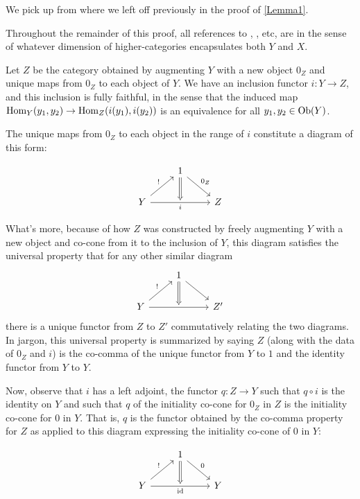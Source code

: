 \documentclass[./main.tex]{subfiles}
\begin{document}
\begin{proofEnd}
We pick up from where we left off previously in the proof of \cref{Lemma1}.

Throughout the remainder of this proof, all references to , , etc, are in the sense of whatever dimension of higher-categories encapsulates both $Y$ and $X$.

Let $Z$ be the category obtained by augmenting $Y$ with a new object $0_Z$ and unique maps from $0_Z$ to each object of $Y$. We have an inclusion functor $i : Y \to Z$, and this inclusion is fully faithful, in the sense that the induced map $\operatorname{Hom}_Y(y_1, y_2) \to \operatorname{Hom}_Z(i(y_1), i(y_2))$ is an equivalence for all $y_1, y_2 \in \operatorname{Ob}(Y)$.

The unique maps from $0_Z$ to each object in the range of $i$ constitute a diagram of this form:

\[\begin{tikzcd}
	& 1 \\
	Y && Z
	\arrow["\unique", from=2-1, to=1-2]
	\arrow["{0_Z}", from=1-2, to=2-3]
	\arrow[""{name=0, anchor=center}, "i"', from=2-1, to=2-3]
	\arrow[Rightarrow, from=1-2, to=0]
\end{tikzcd}\]

What's more, because of how $Z$ was constructed by freely augmenting $Y$ with a new object and co-cone from it to the inclusion of $Y$, this diagram satisfies the universal property that for any other similar diagram
\[\begin{tikzcd}
	& 1 \\
	Y && Z'
	\arrow["\unique", from=2-1, to=1-2]
	\arrow[from=1-2, to=2-3]
	\arrow[""{name=0, anchor=center}, from=2-1, to=2-3]
	\arrow[Rightarrow, from=1-2, to=0]
\end{tikzcd}\]
there is a unique functor from $Z$ to $Z'$ commutatively relating the two diagrams. In jargon, this universal property is summarized by saying $Z$ (along with the data of $0_Z$ and $i$) is the co-comma of the unique functor from $Y$ to $1$ and the identity functor from $Y$ to $Y$.

Now, observe that $i$ has a left adjoint, the functor $q : Z \to Y$ such that $q \circ i$ is the identity on $Y$ and such that $q$ of the initiality co-cone for $0_Z$ in $Z$ is the initiality co-cone for $0$ in $Y$. That is, $q$ is the functor obtained by the co-comma property for $Z$ as applied to this diagram expressing the initiality co-cone of $0$ in $Y$:

\[\begin{tikzcd}
	& 1 \\
	Y && Y
	\arrow["\unique", from=2-1, to=1-2]
	\arrow["{0}", from=1-2, to=2-3]
	\arrow[""{name=0, anchor=center}, "\id"', from=2-1, to=2-3]
	\arrow[Rightarrow, from=1-2, to=0]
\end{tikzcd}\]


\end{proofEnd}
\end{document}
